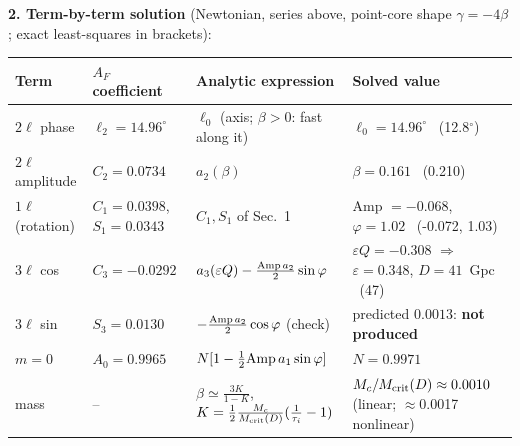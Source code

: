 \documentclass[10pt]{article}
\begin{document}
{\textbf{2. Term-by-term solution} (Newtonian, series above, point-core shape $\gamma=-4\beta$; exact least-squares in brackets):
\begin{center}\footnotesize\setlength{\tabcolsep}{3pt}\begin{tabular}{llll}\toprule
Term & $A_F$ coefficient & Analytic expression & Solved value\\\midrule
$2\ell$ phase & $\ell_2=14.96^\circ$ & $\ell_0$ (axis; $\beta>0$: fast along it) & $\ell_0=14.96^\circ$ \ (12.8$^\circ$)\\
$2\ell$ amplitude & $C_2=0.0734$ & $a_2(\beta)$ & $\beta=0.161$ \ (0.210)\\
$1\ell$ (rotation) & $C_1=0.0398$, $S_1=0.0343$ & $C_1,S_1$ of Sec.~1 & Amp $=-0.068$, $\varphi=1.02$ \ (-0.072, 1.03)\\
$3\ell$ cos & $C_3=-0.0292$ & $a_3(\varepsilon Q)-\frac{{\rm Amp}\,a_2}2\sin\varphi$ & $\varepsilon Q=-0.308$ $\Rightarrow$ $\varepsilon=0.348$, $D=41$~Gpc \ (47)\\
$3\ell$ sin & $S_3=0.0130$ & $-\frac{{\rm Amp}\,a_2}2\cos\varphi$ (check) & predicted $0.0013$: \textbf{not produced}\\
$m=0$ & $A_0=0.9965$ & $N[1-\frac12{\rm Amp}\,a_1\sin\varphi]$ & $N=0.9971$\\\midrule
mass & -- & $\beta\simeq\frac{3K}{1-K}$, $K=\frac12\frac{M_c}{M_{\rm crit}(D)}(\frac1{\tau_i}-1)$ & $M_c/M_{\rm crit}(D)\approx0.0010$ (linear; $\approx$0.0017 nonlinear)\\\bottomrule
\end{tabular}\end{center}
\vspace{6pt}

}
\end{document}
